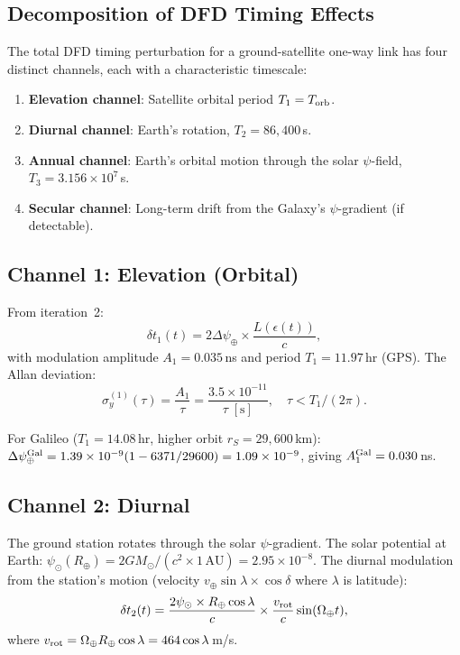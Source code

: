 \documentclass[aps,prd,twocolumn,superscriptaddress]{revtex4-2}
\newcommand{\Rearth}{R_\oplus}
\newcommand{\Msun}{M_\odot}
\begin{document}
\subsection{Decomposition of DFD Timing Effects}

The total DFD timing perturbation for a ground-satellite one-way
link has four distinct channels, each with a characteristic
timescale:

\begin{enumerate}
\item \textbf{Elevation channel}: Satellite orbital period
$T_1 = T_{\rm orb}$.
\item \textbf{Diurnal channel}: Earth's rotation, $T_2 = 86{,}400$\,s.
\item \textbf{Annual channel}: Earth's orbital motion through
the solar $\psi$-field, $T_3 = 3.156\times10^7$\,s.
\item \textbf{Secular channel}: Long-term drift from the Galaxy's
$\psi$-gradient (if detectable).
\end{enumerate}

\subsection{Channel 1: Elevation (Orbital)}

From iteration~2:
\begin{equation}
\delta t_1(t) = 2\Delta\psi_\oplus\times\frac{L(\epsilon(t))}{c},
\end{equation}
with modulation amplitude $A_1 = 0.035$\,ns and period
$T_1 = 11.97$\,hr (GPS). The Allan deviation:
\begin{equation}
\sigma_y^{(1)}(\tau) = \frac{A_1}{\tau}
= \frac{3.5\times10^{-11}}{\tau\;[\text{s}]},
\quad \tau < T_1/(2\pi).
\end{equation}

For Galileo ($T_1 = 14.08$\,hr, higher orbit $r_S = 29{,}600$\,km):
$\Delta\psi_\oplus^{\rm Gal} = 1.39\times10^{-9}(1-6371/29600)
= 1.09\times10^{-9}$, giving $A_1^{\rm Gal} = 0.030$\,ns.

\subsection{Channel 2: Diurnal}

The ground station rotates through the solar $\psi$-gradient.
The solar potential at Earth: $\psi_\odot(\Rearth) =
2G\Msun/(c^2\times1\,\text{AU}) = 2.95\times10^{-8}$.
The diurnal modulation from the station's motion (velocity
$v_\oplus\sin\lambda\times\cos\delta$ where $\lambda$ is latitude):
\begin{equation}
\delta t_2(t) = \frac{2\psi_\odot\times\Rearth\cos\lambda}{c}
\times\frac{v_{\rm rot}}{c}\sin(\Omega_\oplus t),
\end{equation}
where $v_{\rm rot} = \Omega_\oplus\Rearth\cos\lambda = 464\cos\lambda$\,m/s.
\end{document}

